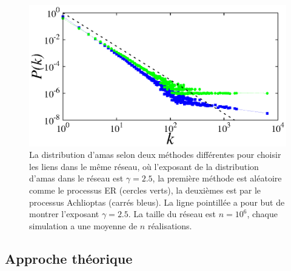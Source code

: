  \begin{figure}[h!]
 	\centering
 	\includegraphics[scale=1.2]{./figures/fig-gama}
 	\caption{La distribution d'amas selon deux méthodes différentes pour choisir les liens dans le même réseau, où l'exposant de la distribution d'amas dans le réseau est $\gamma=2.5$, la première méthode est aléatoire comme le processus ER (cercles verts), la deuxièmes est par le processus Achlioptas \cite{Achlioptas-al2009} (carrés bleus). La ligne pointillée a pour but de montrer  l'exposant  $\gamma=2.5$. La taille du réseau est $n=10^6$, chaque simulation a une moyenne de $n$ réalisations. }
 	\label{gama-5}
 \end{figure}
 
\subsection{Approche théorique}
